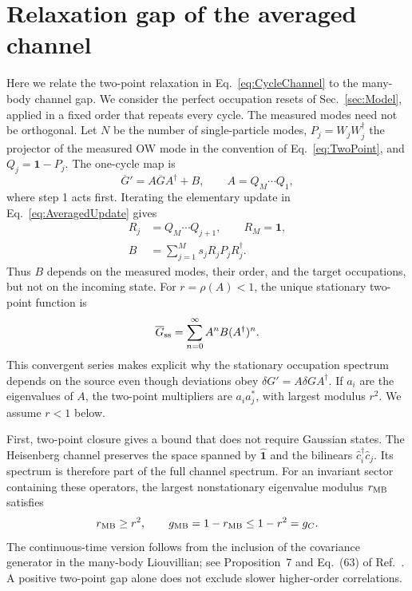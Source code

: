 \documentclass[aps,prb,10pt,twocolumn,superscriptaddress,longbibliography,floatfix]{revtex4-2}
\newcommand{\claudeadd}[1]{{\color{orange}#1}}
\begin{document}
{\color{blue}
\section{Relaxation gap of the averaged channel}
\label{app:ChannelGap}

Here we relate the two-point relaxation in Eq.~\eqref{eq:CycleChannel} to the many-body channel gap. We consider the perfect occupation resets of Sec.~\ref{sec:Model}, applied in a fixed order that repeats every cycle. The measured modes need not be orthogonal. Let $N$ be the number of single-particle modes, \claudeadd{$P_j=W_jW_j^\dagger$} the projector of the measured OW mode in the convention of Eq.~\eqref{eq:TwoPoint}, and $Q_j=\mathbf{1}-P_j$. The one-cycle map is
\begin{equation}
    \overline G'=A\overline GA^\dagger+B,
    \qquad A=Q_M\cdots Q_1,
    \label{eq:AppCycleChannel}
\end{equation}
where step 1 acts first. Iterating the elementary update in Eq.~\eqref{eq:AveragedUpdate} gives
\begin{align}
 R_j&=Q_M\cdots Q_{j+1},\qquad R_M=\mathbf{1},\nonumber\\
 B&=\sum_{j=1}^{M}s_jR_jP_jR_j^\dagger.
 \label{eq:CycleSource}
\end{align}
Thus $B$ depends on the measured modes, their order, and the target occupations, but not on the incoming state. For $r=\rho(A)<1$, the unique stationary two-point function is
\begin{equation}
 \overline G_{\rm ss}=\sum_{n=0}^{\infty}A^nB(A^\dagger)^n.
 \label{eq:StationaryCovariance}
\end{equation}
This convergent series makes explicit why the stationary occupation spectrum depends on the source even though deviations obey $\delta G'=A\delta GA^\dagger$. If $a_i$ are the eigenvalues of $A$, the two-point multipliers are $a_i a_j^*$, with largest modulus $r^2$. We assume $r<1$ below.

First, two-point closure gives a bound that does not require Gaussian states. The Heisenberg channel preserves the space spanned by $\hat{\mathbf{1}}$ and the bilinears $\hat c_i^\dagger\hat c_j$. Its spectrum is therefore part of the full channel spectrum. For an invariant sector containing these operators, the largest nonstationary eigenvalue modulus $r_{\rm MB}$ satisfies
\begin{equation}
    r_{\rm MB}\geq r^2,
    \qquad g_{\rm MB}=1-r_{\rm MB}\leq 1-r^2=g_C.
    \label{eq:ChannelGapBound}
\end{equation}
The continuous-time version follows from the inclusion of the covariance generator in the many-body Liouvillian; see Proposition~7 and Eq.~(63) of Ref.~\cite{BarthelZhang2022}. A positive two-point gap alone does not exclude slower higher-order correlations.

}
\end{document}
